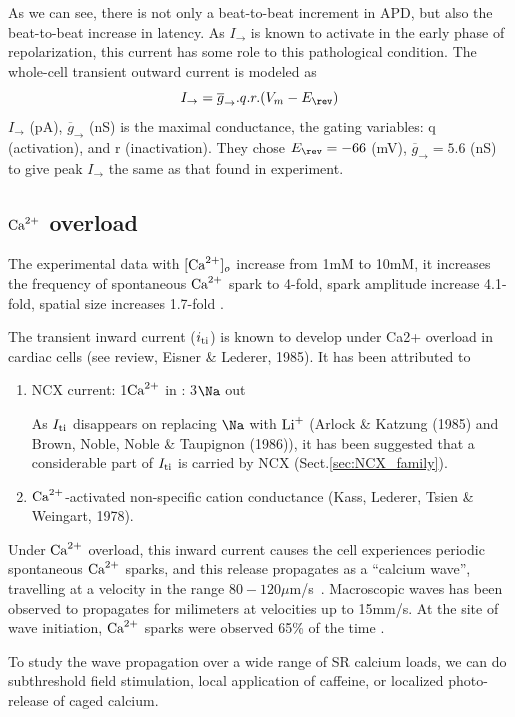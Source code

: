As we can see, there is not only a beat-to-beat increment in APD, but also the
beat-to-beat increase in latency. As $I_\to$ is known to activate in the early
phase of repolarization, this current has some role to this pathological
condition. The whole-cell transient outward current is modeled as
\begin{equation}	
I_\to = \overline{g}_\to.q.r.(V_m-E_\rev)
\end{equation}
$I_\to$ (pA), $\overline{g}_\to$ (nS) is the maximal conductance, the gating
variables: q (activation), and r (inactivation). They chose $E_\rev=-66$ (mV),
$\overline{g}_\to=5.6$ (nS) to give peak $I_\to$ the same as that found in
experiment. 


\subsection{${\text{Ca}^{2+}}$ overload}
\label{sec:calcium-overload}

The experimental data with $[{\text{Ca}^{2+}}]_o$ increase from 1mM to 10mM, it increases the
frequency of spontaneous ${\text{Ca}^{2+}}$ spark to 4-fold, spark amplitude increase
4.1-fold, spatial size increases 1.7-fold \citep{cheng1996csc}. 

The transient inward current ($i_{\text{ti}}$) is known to develop under Ca2+ overload
in cardiac cells (see review, Eisner \& Lederer, 1985). It has been attributed
to
\begin{enumerate}
  \item NCX current: 1${\text{Ca}^{2+}}$ in : 3$\Na$ out

As $I_{\text{ti}}$ disappears on replacing $\Na$ with $\Li$ (Arlock \& Katzung (1985)
and Brown, Noble, Noble \& Taupignon (1986)), it has been suggested that a
considerable part of $I_{\text{ti}}$ is carried by NCX (Sect.\ref{sec:NCX_family}).
  
  \item ${\text{Ca}^{2+}}$-activated non-specific cation conductance (Kass, Lederer, Tsien \&
Weingart, 1978).
\end{enumerate}

Under ${\text{Ca}^{2+}}$ overload, this inward current causes the cell experiences periodic
spontaneous ${\text{Ca}^{2+}}$ sparks, and this release propagates as a ``calcium wave'', travelling
at a velocity in the range
$80-120\mu$m/s~\citep{stern1992tec}. Macroscopic waves has been
observed to propagates for milimeters at velocities up to 15mm/s. At the site
of wave initiation, ${\text{Ca}^{2+}}$ sparks were observed 65\% of the time
\citep{cheng1996csc}. 

To study the wave propagation over a wide range of SR calcium loads,
we can do subthreshold field stimulation, local application of
caffeine, or localized photo-release of caged calcium. 


